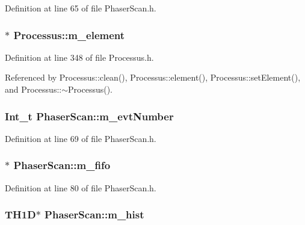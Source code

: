 Definition at line 65 of file PhaserScan.h.\hypertarget{classProcessus_aa9d24d53c3e52f36786cabb5d8e296e7}{
\subsubsection[{m\_\-element}]{$\ast$ {\bf Processus::m\_\-element}}}
\label{classProcessus_aa9d24d53c3e52f36786cabb5d8e296e7}


Definition at line 348 of file Processus.h.

Referenced by Processus::clean(), Processus::element(), Processus::setElement(), and Processus::$\sim$Processus().\hypertarget{classPhaserScan_a038d4303bd3f2446417ec2af5d9995cf}{
\subsubsection[{m\_\-evtNumber}]{\setlength{\rightskip}{0pt plus 5cm}Int\_\-t {\bf PhaserScan::m\_\-evtNumber}}}
\label{classPhaserScan_a038d4303bd3f2446417ec2af5d9995cf}


Definition at line 69 of file PhaserScan.h.\hypertarget{classPhaserScan_a4249cdec58c8163d9f3663be8e929cdf}{
\subsubsection[{m\_\-fifo}]{$\ast$ {\bf PhaserScan::m\_\-fifo}}}
\label{classPhaserScan_a4249cdec58c8163d9f3663be8e929cdf}


Definition at line 80 of file PhaserScan.h.\hypertarget{classPhaserScan_abd6954d739e7b2b0d36d09a080146d60}{
\subsubsection[{m\_\-hist}]{\setlength{\rightskip}{0pt plus 5cm}TH1D$\ast$ {\bf PhaserScan::m\_\-hist}}}
\label{classPhaserScan_abd6954d739e7b2b0d36d09a080146d60}


